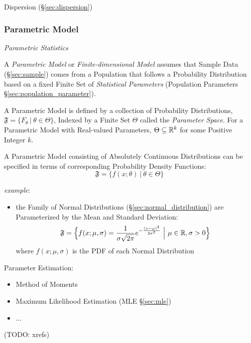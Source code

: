 
Dispersion (\S\ref{sec:dispersion})



\subsubsection{Parametric Model}\label{sec:parametric_model}

\emph{Parametric Statistics}

A \emph{Parametric Model} or \emph{Finite-dimensional Model} assumes that Sample
Data (\S\ref{sec:sample}) comes from a Population that follows a Probability
Distribution based on a fixed Finite Set of \emph{Statistical Parameters}
(Population Parameters \S\ref{sec:population_parameter}).

A Parametric Model is defined by a collection of Probability Distributions,
$\mathfrak{F} = \{ F_\theta \ |\ \theta \in \Theta \}$, Indexed by a Finite Set
$\Theta$ called the \emph{Parameter Space}. For a Parametric Model with
Real-valued Parameters, $\Theta \subseteq \mathbb{R}^k$ for some Positive Integer
$k$.

A Parametric Model consisting of Absolutely Continuous Distributions
can be specified in terms of corresponding Probability Density Functions:
\[
  \mathfrak{F} = \{ f(x; \theta) \ |\ \theta \in \Theta \}
\]

\emph{example}:
\begin{itemize}
  \item the Family of Normal Distributions (\S\ref{sec:normal_distribution}) are
    Parameterized by the Mean and Standard Deviation:
    \[
      \mathfrak{F} = \Big\{
        f(x; \mu, \sigma) =
          \frac{1}{\sigma\sqrt{2\pi}}e^{-\frac{(x-\mu)^2}{2\sigma^2}}
        \ \Big|\ \mu \in \mathbb{R}, \sigma > 0
      \Big\}
    \]
    where $f(x; \mu, \sigma)$ is the PDF of each Normal Distribution
\end{itemize}

Parameter Estimation:
\begin{itemize}
  \item Method of Moments
  \item Maximum Likelihood Estimation (MLE \S\ref{sec:mle})
  \item ...
\end{itemize}
(TODO: xrefs)

